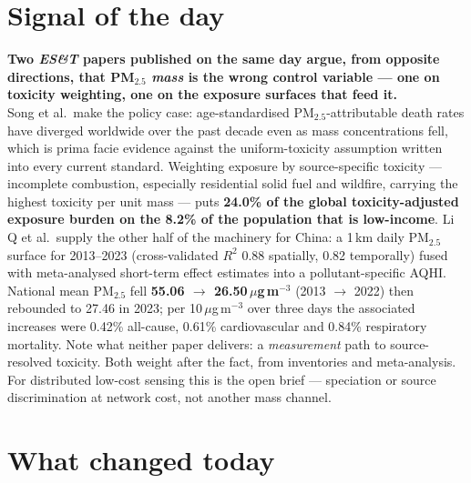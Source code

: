\documentclass[10pt]{article}
\begin{document}
\vspace{6mm}

\section*{\sffamily\bfseries\color{Deep}Signal of the day}
\vspace{-1.5mm}{\color{Amber}\rule{\linewidth}{1.1pt}}\vspace{2.5mm}

\begin{keybox}
{\sffamily\bfseries\small\color{Deep}Two \textit{ES\&T} papers published on the same day
argue, from opposite directions, that PM$_{2.5}$ \emph{mass} is the wrong control
variable --- one on toxicity weighting, one on the exposure surfaces that feed it.}\\[1.4mm]
\footnotesize
Song et al.\ make the policy case: age-standardised PM$_{2.5}$-attributable death rates
have diverged worldwide over the past decade even as mass concentrations fell, which is
prima facie evidence against the uniform-toxicity assumption written into every current
standard. Weighting exposure by source-specific toxicity --- incomplete combustion,
especially residential solid fuel and wildfire, carrying the highest toxicity per unit
mass --- puts \textbf{24.0\% of the global toxicity-adjusted exposure burden on the 8.2\%
of the population that is low-income}. Li Q et al.\ supply the other half of the machinery
for China: a 1\,km daily PM$_{2.5}$ surface for 2013--2023 (cross-validated
$R^2$ 0.88 spatially, 0.82 temporally) fused with meta-analysed short-term effect
estimates into a pollutant-specific AQHI. National mean PM$_{2.5}$ fell
\textbf{55.06 $\to$ 26.50\,$\mu$g\,m$^{-3}$} (2013 $\to$ 2022) then rebounded to 27.46 in
2023; per 10\,$\mu$g\,m$^{-3}$ over three days the associated increases were 0.42\%
all-cause, 0.61\% cardiovascular and 0.84\% respiratory mortality. Note what neither paper
delivers: a \emph{measurement} path to source-resolved toxicity. Both weight after the
fact, from inventories and meta-analysis. For distributed low-cost sensing this is the
open brief --- speciation or source discrimination at network cost, not another mass
channel.
\end{keybox}

\vspace{3mm}

\section*{\sffamily\bfseries\color{Deep}What changed today}
\vspace{-1.5mm}{\color{Amber}\rule{\linewidth}{1.1pt}}\vspace{2.5mm}
\end{document}
